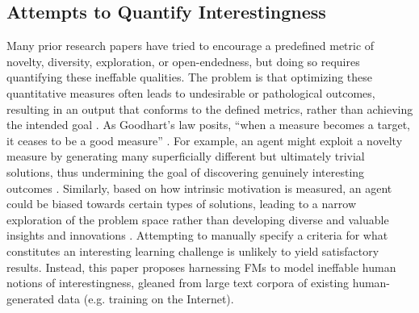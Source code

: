 \documentclass{article} %
\begin{document}
\subsection{Attempts to Quantify Interestingness}
Many prior research papers have tried to encourage a predefined metric of novelty, diversity, exploration, or open-endedness, but doing so requires quantifying these ineffable qualities. The problem is that optimizing these quantitative measures often leads to undesirable or pathological outcomes, resulting in an output that conforms to the defined metrics, rather than achieving the intended goal \citep{aubret2019survey, pathak2017curiositydriven, osband2018randomized, colas2022autotelic, oudeyer2007intrinsic, etcheverry2021hierarchically, lehman2011novelty, mouret2011, mouret2015illuminating, nslc, eysenbach2018diversity, bellemare2016unifying, ecoffet2021goexplore, Ecoffet_2021, mendonca2023alan, Lehman2012BeyondOQ, lehman2019surprising, nguyen2015innovation, auerbach2010cppn, zhou2023learning, cai2023open}. As Goodhart's law posits, ``when a measure becomes a target, it ceases to be a good measure'' \citep{Strathern1997}. For example, an agent might exploit a novelty measure by generating many superficially different but ultimately trivial solutions, thus undermining the goal of discovering genuinely interesting outcomes \citep{lehman2011novelty}. Similarly, based on how intrinsic motivation is measured, an agent could be biased towards certain types of solutions, leading to a narrow exploration of the problem space rather than developing diverse and valuable insights and innovations \citep{aubret2019survey}. Attempting to manually specify a criteria for what constitutes an interesting learning challenge is unlikely to yield satisfactory results. Instead, this paper proposes harnessing FMs to model ineffable human notions of interestingness, gleaned from large text corpora of existing human-generated data (e.g. training on the Internet).
\end{document}
